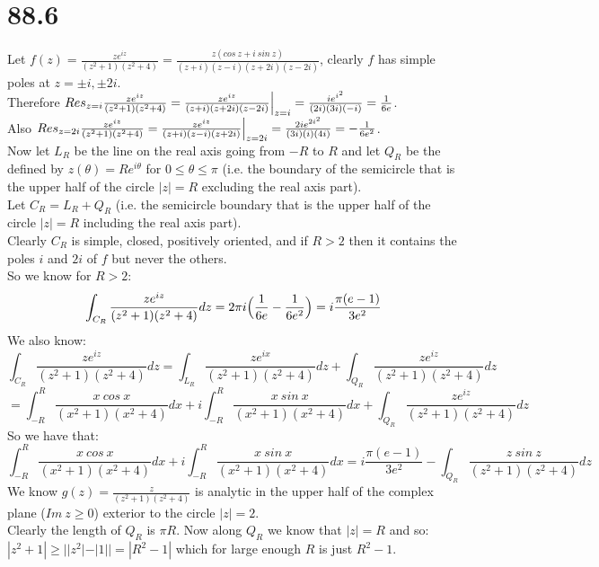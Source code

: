 \documentclass{article}
\begin{document}
\newpage
\section*{88.6}
\begin{center}
    \doublespacing
    Let $f(z) =\frac{ze^{iz}}{(z^2 + 1)(z^2 + 4)} =\frac{z(cos\:z + i\:sin\:z)}{(z + i)(z - i)(z + 2i)(z - 2i)}$, clearly $f$ has simple poles at $z =\pm i,\pm 2i$.
    \\Therefore $Res_{z=i}\frac{ze^{iz}}{(z^2 + 1)(z^2 + 4)} =\frac{ze^{iz}}{(z + i)(z + 2i)(z - 2i)}\Big{|}_{z=i} =\frac{ie^{i^2}}{(2i)(3i)(-i)} =\frac{1}{6e}$.
    \\Also $Res_{z=2i}\frac{ze^{iz}}{(z^2 + 1)(z^2 + 4)} =\frac{ze^{iz}}{(z + i)(z - i)(z + 2i)}\Big{|}_{z=2i} =\frac{2ie^{2i^2}}{(3i)(i)(4i)} = -\frac{1}{6e^2}$.
    \\Now let $L_R$ be the line on the real axis going from $-R$ to $R$ and let $Q_R$ be the defined by $z(\theta) = Re^{i\theta}$ for $0\leq\theta\leq\pi$ (i.e. the boundary of the semicircle that is the upper half of the circle $|z| = R$ excluding the real axis part).
    \\Let $C_R = L_R + Q_R$ (i.e. the semicircle boundary that is the upper half of the circle $|z| = R$ including the real axis part).
    \\Clearly $C_R$ is simple, closed, positively oriented, and if $R > 2$ then it contains the poles $i$ and $2i$ of $f$ but never the others.
    \\So we know for $R > 2$:
    \[\int _{C_R}\frac{ze^{iz}}{(z^2 + 1)(z^2 + 4)} dz = 2\pi i\Big{(}\frac{1}{6e} -\frac{1}{6e^2}\Big{)} = i\frac{\pi (e - 1)}{3e^2}\]
    We also know:
    \[\int _{C_R}\frac{ze^{iz}}{(z^2 + 1)(z^2 + 4)} dz =\int _{L_R}\frac{ze^{ix}}{(z^2 + 1)(z^2 + 4)} dz +\int _{Q_R}\frac{ze^{iz}}{(z^2 + 1)(z^2 + 4)} dz\]
    \[=\int _{-R}^R\frac{x\:cos\:x}{(x^2 + 1)(x^2 + 4)} dx + i\int _{-R}^R\frac{x\:sin\:x}{(x^2 + 1)(x^2 + 4)} dx +\int _{Q_R}\frac{ze^{iz}}{(z^2 + 1)(z^2 + 4)} dz\]
    So we have that:
    \[\int _{-R}^R\frac{x\:cos\:x}{(x^2 + 1)(x^2 + 4)} dx + i\int _{-R}^R\frac{x\:sin\:x}{(x^2 + 1)(x^2 + 4)} dx = i\frac{\pi (e - 1)}{3e^2} -\int _{Q_R}\frac{z\:sin\:z}{(z^2 + 1)(z^2 + 4)} dz\]
    We know $g(z) =\frac{z}{(z^2 + 1)(z^2 + 4)}$ is analytic in the upper half of the complex plane ($Im\:z\geq 0$) exterior to the circle $|z| = 2$.
    \\Clearly the length of $Q_R$ is $\pi R$. Now along $Q_R$ we know that $|z| = R$ and so:
    \\$|z^2 + 1|\geq ||z^2| - |1|| = |R^2 - 1|$ which for large enough $R$ is just $R^2 - 1$.

\end{center}
\end{document}
